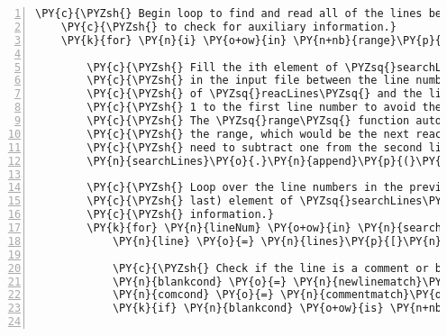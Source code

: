 \begin{Verbatim}[commandchars=\\\{\},fontsize=\small,numbers=left,firstnumber=1,stepnumber=2,firstline=2]
    \PY{c}{\PYZsh{} Begin loop to find and read all of the lines between each reaction}
    \PY{c}{\PYZsh{} to check for auxiliary information.}
    \PY{k}{for} \PY{n}{i} \PY{o+ow}{in} \PY{n+nb}{range}\PY{p}{(}\PY{n+nb}{len}\PY{p}{(}\PY{n}{reacLines}\PY{p}{)}\PY{o}{\PYZhy{}}\PY{l+m+mi}{1}\PY{p}{)}\PY{p}{:}

        \PY{c}{\PYZsh{} Fill the ith element of \PYZsq{}searchLines\PYZsq{} with a list of lines}
        \PY{c}{\PYZsh{} in the input file between the line number in the ith element}
        \PY{c}{\PYZsh{} of \PYZsq{}reacLines\PYZsq{} and the line number in the (i+1)th element. Add}
        \PY{c}{\PYZsh{} 1 to the first line number to avoid the reaction line itself.}
        \PY{c}{\PYZsh{} The \PYZsq{}range\PYZsq{} function automatically excludes the last number in}
        \PY{c}{\PYZsh{} the range, which would be the next reaction, so there is no}
        \PY{c}{\PYZsh{} need to subtract one from the second line number.}
        \PY{n}{searchLines}\PY{o}{.}\PY{n}{append}\PY{p}{(}\PY{n+nb}{list}\PY{p}{(}\PY{n+nb}{range}\PY{p}{(}\PY{n}{reacLines}\PY{p}{[}\PY{n}{i}\PY{p}{]}\PY{o}{+}\PY{l+m+mi}{1}\PY{p}{,}\PY{n}{reacLines}\PY{p}{[}\PY{n}{i}\PY{o}{+}\PY{l+m+mi}{1}\PY{p}{]}\PY{p}{)}\PY{p}{)}\PY{p}{)}

        \PY{c}{\PYZsh{} Loop over the line numbers in the previously appended (i.e.}
        \PY{c}{\PYZsh{} last) element of \PYZsq{}searchLines\PYZsq{} to look for auxiliary}
        \PY{c}{\PYZsh{} information.}
        \PY{k}{for} \PY{n}{lineNum} \PY{o+ow}{in} \PY{n}{searchLines}\PY{p}{[}\PY{o}{\PYZhy{}}\PY{l+m+mi}{1}\PY{p}{]}\PY{p}{:}
            \PY{n}{line} \PY{o}{=} \PY{n}{lines}\PY{p}{[}\PY{n}{lineNum}\PY{p}{]}

            \PY{c}{\PYZsh{} Check if the line is a comment or blank.}
            \PY{n}{blankcond} \PY{o}{=} \PY{n}{newlinematch}\PY{o}{.}\PY{n}{match}\PY{p}{(}\PY{n}{line}\PY{p}{)}
            \PY{n}{comcond} \PY{o}{=} \PY{n}{commentmatch}\PY{o}{.}\PY{n}{match}\PY{p}{(}\PY{n}{line}\PY{p}{)}
            \PY{k}{if} \PY{n}{blankcond} \PY{o+ow}{is} \PY{n+nb+bp}{None} \PY{o+ow}{and} \PY{n}{comcond} \PY{o+ow}{is} \PY{n+nb+bp}{None}\PY{p}{:}


\end{Verbatim}
